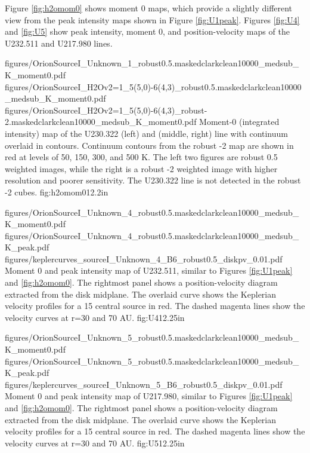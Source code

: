 \documentclass[twocolumn]{aastex61}
\begin{document}
Figure \ref{fig:h2omom0} shows moment 0 maps, which provide a slightly
different view from the peak intensity maps shown in Figure \ref{fig:U1peak}.
Figures \ref{fig:U4} and \ref{fig:U5} show peak intensity, moment 0, and
position-velocity maps of the U232.511 and U217.980 lines.

\FigureThree
{{figures/OrionSourceI_Unknown_1_robust0.5.maskedclarkclean10000_medsub_K_moment0}.pdf}
{{figures/OrionSourceI_H2Ov2=1_5(5,0)-6(4,3)_robust0.5.maskedclarkclean10000_medsub_K_moment0}.pdf}
{{figures/OrionSourceI_H2Ov2=1_5(5,0)-6(4,3)_robust-2.maskedclarkclean10000_medsub_K_moment0}.pdf}
{Moment-0 (integrated intensity) map of the U230.322 (left) and \water (middle,
right) line with continuum overlaid in contours.  Continuum contours
from the robust -2 map are shown
in red at levels of 
50, 150, 300, and 500 K.
The left two figures are robust 0.5 weighted images, while the right
is a robust -2 weighted image with higher resolution and poorer
sensitivity.  The U230.322 line is not detected in the robust -2 cubes.
}
{fig:h2omom0}{1}{2.2in}

\FigureThree
{{figures/OrionSourceI_Unknown_4_robust0.5.maskedclarkclean10000_medsub_K_moment0}.pdf}
{{figures/OrionSourceI_Unknown_4_robust0.5.maskedclarkclean10000_medsub_K_peak}.pdf}
{{figures/keplercurves_sourceI_Unknown_4_B6_robust0.5_diskpv_0.01}.pdf}
{Moment 0 and peak intensity map of U232.511, similar to Figures \ref{fig:U1peak} and \ref{fig:h2omom0}.
The rightmost panel shows a position-velocity diagram extracted from the disk midplane.
The overlaid  curve shows the Keplerian velocity profiles for a 15 \msun central source in red.
The dashed magenta lines show the velocity curves at r=30 and 70 AU.
}
{fig:U4}{1}{2.25in}

\FigureThree
{{figures/OrionSourceI_Unknown_5_robust0.5.maskedclarkclean10000_medsub_K_moment0}.pdf}
{{figures/OrionSourceI_Unknown_5_robust0.5.maskedclarkclean10000_medsub_K_peak}.pdf}
{{figures/keplercurves_sourceI_Unknown_5_B6_robust0.5_diskpv_0.01}.pdf}
{Moment 0 and peak intensity map of U217.980, similar to Figures \ref{fig:U1peak} and \ref{fig:h2omom0}.
The rightmost panel shows a position-velocity diagram extracted from the disk midplane.
The overlaid  curve shows the Keplerian velocity profiles for a 15 \msun central source in red.
The dashed magenta lines show the velocity curves at r=30 and 70 AU.
}
{fig:U5}{1}{2.25in}
\end{document}
